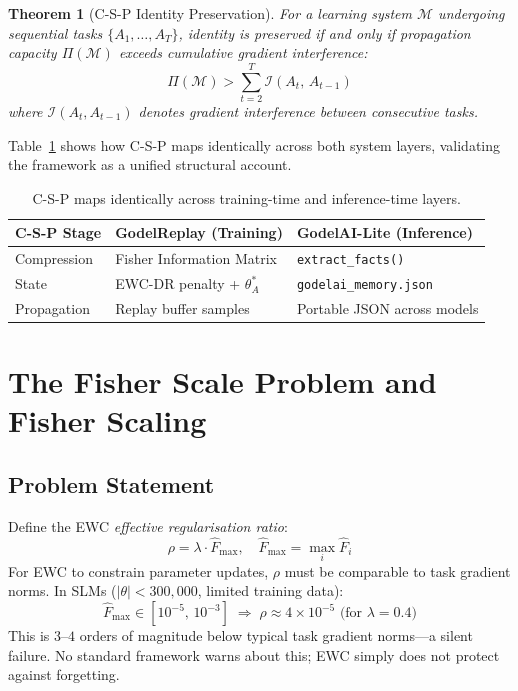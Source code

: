 \documentclass[12pt]{article}
\newtheorem{theorem}{Theorem}
\begin{document}
\begin{theorem}[C-S-P Identity Preservation]
  For a learning system $\mathcal{M}$ undergoing sequential tasks
  $\{A_1,\ldots,A_T\}$, identity is preserved if and only if propagation
  capacity $\Pi(\mathcal{M})$ exceeds cumulative gradient interference:
  \[
    \Pi(\mathcal{M}) > \sum_{t=2}^{T} \mathcal{I}(A_t,\, A_{t-1})
  \]
  where $\mathcal{I}(A_t,A_{t-1})$ denotes gradient interference between
  consecutive tasks.
\end{theorem}

Table~\ref{tab:csp-mapping} shows how C-S-P maps identically across both
system layers, validating the framework as a unified structural account.

\begin{table}[ht]
\centering
\caption{C-S-P maps identically across training-time and inference-time layers.}
\label{tab:csp-mapping}
\begin{tabular}{lll}
\toprule
\textbf{C-S-P Stage} & \textbf{GodelReplay (Training)} & \textbf{GodelAI-Lite (Inference)} \\
\midrule
Compression & Fisher Information Matrix & \texttt{extract\_facts()} \\
State       & EWC-DR penalty + $\theta^*_A$ & \texttt{godelai\_memory.json} \\
Propagation & Replay buffer samples      & Portable JSON across models \\
\bottomrule
\end{tabular}
\end{table}

\section{The Fisher Scale Problem and Fisher Scaling}
\label{sec:fisher}

\subsection{Problem Statement}

Define the EWC \emph{effective regularisation ratio}:
\[
  \rho = \lambda \cdot \hat{F}_{\max}, \quad
  \hat{F}_{\max} = \max_i \hat{F}_i
\]
For EWC to constrain parameter updates, $\rho$ must be comparable to
task gradient norms. In SLMs ($|\theta| < 300{,}000$, limited training data):
\[
  \hat{F}_{\max} \in [10^{-5},\, 10^{-3}]
  \;\Rightarrow\;
  \rho \approx 4\times10^{-5} \text{ (for }\lambda{=}0.4\text{)}
\]
This is $3$--$4$ orders of magnitude below typical task gradient norms---a
silent failure. No standard framework warns about this; EWC simply does not
protect against forgetting.
\end{document}
